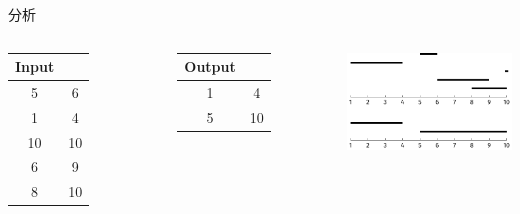 \begin{frame}{分析}
    \begin{columns}
            \begin{table}
                \begin{tabular}{cc}
                Input \\\hline
                5  & 6 \\\hline
				1  & 4  \\\hline
				10 & 10 \\\hline
				6  & 9  \\\hline
				8  & 10  \\\hline
                \end{tabular}
            \end{table}
            \begin{table}
                \begin{tabular}{cc}
                Output \\\hline
				1  & 4  \\\hline
				5 & 10 \\\hline
                \end{tabular}
            \end{table}
        \includegraphics[scale=.8]{fig/5-2.pdf}
    \end{columns}
\end{frame}
